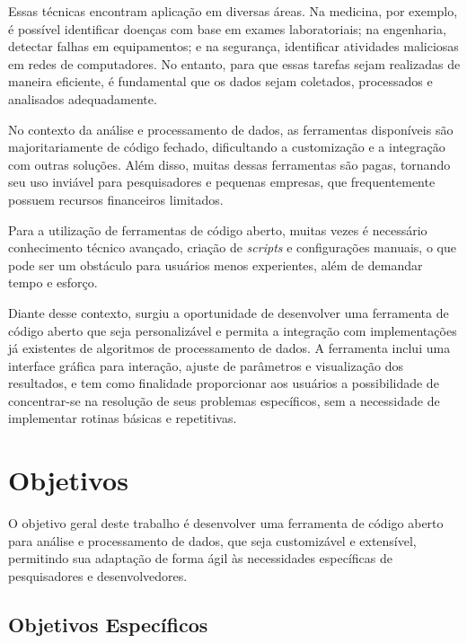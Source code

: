 Essas técnicas encontram aplicação em diversas áreas. Na medicina, por exemplo, é possível identificar doenças com base em exames laboratoriais; na engenharia, detectar falhas em equipamentos; e na segurança, identificar atividades maliciosas em redes de computadores. No entanto, para que essas tarefas sejam realizadas de maneira eficiente, é fundamental que os dados sejam coletados, processados e analisados adequadamente.

No contexto da análise e processamento de dados, as ferramentas disponíveis são majoritariamente de código fechado, dificultando a customização e a integração com outras soluções. Além disso, muitas dessas ferramentas são pagas, tornando seu uso inviável para pesquisadores e pequenas empresas, que frequentemente possuem recursos financeiros limitados.

Para a utilização de ferramentas de código aberto, muitas vezes é necessário conhecimento técnico avançado, criação de \textit{scripts} e configurações manuais, o que pode ser um obstáculo para usuários menos experientes, além de demandar tempo e esforço.

Diante desse contexto, surgiu a oportunidade de desenvolver uma ferramenta de código aberto que seja personalizável e permita a integração com implementações já existentes de algoritmos de processamento de dados. A ferramenta inclui uma interface gráfica para interação, ajuste de parâmetros e visualização dos resultados, e tem como finalidade proporcionar aos usuários a possibilidade de concentrar-se na resolução de seus problemas específicos, sem a necessidade de implementar rotinas básicas e repetitivas.

\section{Objetivos}
\label{sec:1:objetivos}

O objetivo geral deste trabalho é desenvolver uma ferramenta de código aberto para análise e processamento de dados, que seja customizável e extensível, permitindo sua adaptação de forma ágil às necessidades específicas de pesquisadores e desenvolvedores.

\subsection{Objetivos Específicos}
\label{subsec:1:objetivos-especificos}

